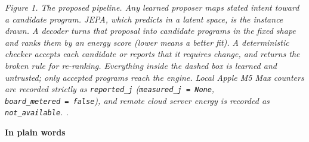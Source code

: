 \documentclass[10pt,letterpaper]{article}
\begin{document}
\emph{Figure 1. The proposed pipeline. Any learned proposer maps stated
intent toward a candidate program. JEPA, which predicts in a latent
space, is the instance drawn. A decoder turns that proposal into
candidate programs in the fixed shape and ranks them by an energy score
(lower means a better fit). A deterministic checker accepts each
candidate or reports that it requires change, and returns the broken
rule for re-ranking. Everything inside the dashed box is learned and
untrusted; only accepted programs reach the engine. Local Apple M5 Max
counters are recorded strictly as \texttt{reported\_\allowbreak{}j}
(\texttt{measured\_\allowbreak{}j\ =\ None}, \texttt{board\_\allowbreak{}metered\ =\ false}), and
remote cloud server energy is recorded as \texttt{not\_\allowbreak{}available}. .}

\textbf{In plain words}
\end{document}
